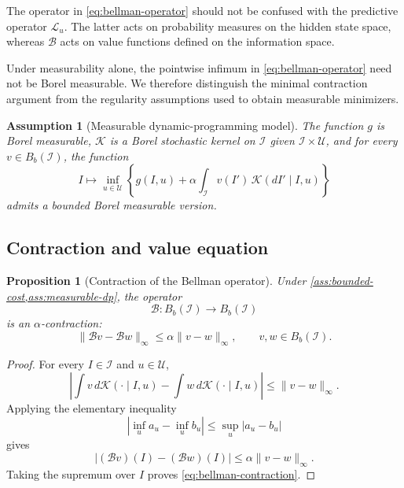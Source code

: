 \documentclass[10pt,twocolumn]{article}
\newtheorem{assumption}{Assumption}
\newtheorem{proposition}{Proposition}
\theoremstyle{remark}
\newcommand{\Ucal}{\mathcal{U}}
\newcommand{\Ical}{\mathcal{I}}
\begin{document}
The operator in \cref{eq:bellman-operator} should not be confused with the predictive operator \(\mathcal L_u\). The latter acts on probability measures on the hidden state space, whereas \(\mathcal B\) acts on value functions defined on the information space.

Under measurability alone, the pointwise infimum in \cref{eq:bellman-operator} need not be Borel measurable. We therefore distinguish the minimal contraction argument from the regularity assumptions used to obtain measurable minimizers.

\begin{assumption}[Measurable dynamic-programming model]
	\label{ass:measurable-dp}
	The function \(g\) is Borel measurable, \(\mathcal K\) is a Borel stochastic kernel on \(\Ical\) given \(\Ical\times\Ucal\), and for every \(v\in B_b(\Ical)\), the function
	\[
	I\longmapsto
	\inf_{u\in\Ucal}
	\left\{
	g(I,u)+\alpha\int_{\Ical}v(I')\,
	\mathcal K(dI'\mid I,u)
	\right\}
	\]
	admits a bounded Borel measurable version.
\end{assumption}

\subsection{Contraction and value equation}
\label{subsec:contraction-value-equation}

\begin{proposition}[Contraction of the Bellman operator]
	\label{prop:bellman-contraction}
	Under \cref{ass:bounded-cost,ass:measurable-dp}, the operator
	\[
	\mathcal B:B_b(\Ical)\longrightarrow B_b(\Ical)
	\]
	is an \(\alpha\)-contraction:
	\begin{equation}
		\|\mathcal Bv-\mathcal Bw\|_\infty
		\leq
		\alpha\|v-w\|_\infty,
		\qquad v,w\in B_b(\Ical).
		\label{eq:bellman-contraction}
	\end{equation}
\end{proposition}

\begin{proof}
	For every \(I\in\Ical\) and \(u\in\Ucal\),
	\[
	\left|
	\int v\,d\mathcal K(\cdot\mid I,u)
	-
	\int w\,d\mathcal K(\cdot\mid I,u)
	\right|
	\leq\|v-w\|_\infty.
	\]
	Applying the elementary inequality
	\[
	\left|\inf_u a_u-\inf_u b_u\right|
	\leq\sup_u|a_u-b_u|
	\]
	gives
	\[
	|(\mathcal Bv)(I)-(\mathcal Bw)(I)|
	\leq\alpha\|v-w\|_\infty.
	\]
	Taking the supremum over \(I\) proves \cref{eq:bellman-contraction}.
\end{proof}
\end{document}
